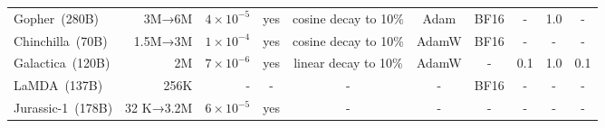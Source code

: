 {\begin{table}[htb]
{\begin{tabular}{lrrccccccc}
Gopher~(280B)           & 3M→6M                                                                             & $4 \times 10^{-5}$                                                          & yes             & cosine decay to 10\%    & Adam                                            & BF16                                                                       & -                                                                                       & 1.0                                                                   & -                \\
Chinchilla~(70B)        & 1.5M→3M                                                                           & $1 \times 10^{-4}$                                                          & yes             & cosine decay to 10\%    & AdamW                                           & BF16                                                                       & -                                                                                       & -                                                                     & -                \\
Galactica~(120B)        & 2M                                                                                & $7 \times 10^{-6}$                                                          & yes             & linear decay to 10\%    & AdamW                                           & -                                                                          & 0.1                                                                                     & 1.0                                                                   & 0.1              \\
LaMDA~(137B)            & 256K                                                                              & -                                                                           & -               & -                       & -                                               & BF16                                                                       & -                                                                                       & -                                                                     & -                \\
Jurassic-1~(178B)       & 32 K→3.2M                                                                         & $6 \times 10^{-5}$                                                          & yes             & -                       & -                                               & -                                                                          & -                                                                                       & -                                                                     & -                \\

\end{tabular}}
\end{table}}
